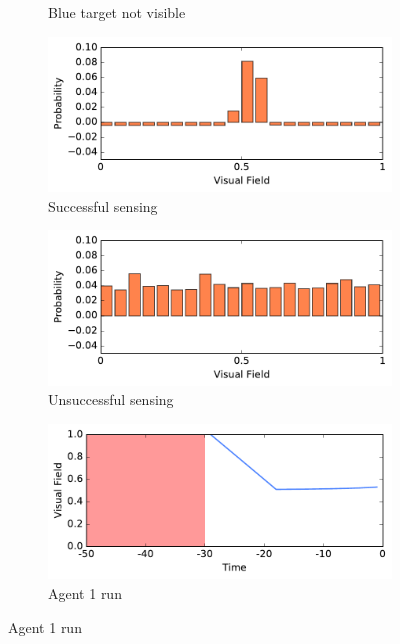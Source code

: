 \documentclass[a4paper,twoside]{article}
\begin{document}
\begin{figure}
\begin{subfigure}{.47\columnwidth}
{	}%
	\caption{Blue target not visible}
	\label{fig:experiment:agent2}
\end{subfigure}
\begin{subfigure}{.49\columnwidth}
	\center
	\includegraphics[width=.98\columnwidth]{img/3_139.pdf}
	\caption{Successful sensing}
	\label{fig:experiment:sensor1}
\end{subfigure}
\begin{subfigure}{.49\columnwidth}
	\center
	\includegraphics[width=.98\columnwidth]{img/3_235.pdf}
	\caption{Unsuccessful sensing}
	\label{fig:experiment:sensor2}
\end{subfigure}
\begin{subfigure}{.49\columnwidth}
	\center
	\includegraphics[width=.98\columnwidth]{img/1_139.pdf}
	\caption{Agent 1 run}
	\label{fig:experiment:pos1}
\end{subfigure}

\end{figure}
\end{document}
